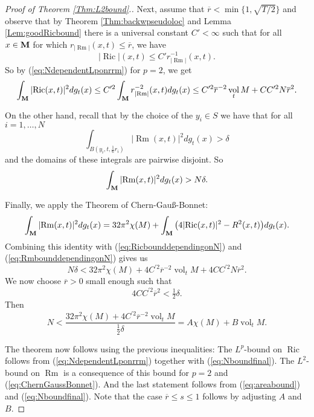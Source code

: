 \documentclass[11pt]{amsart}
\numberwithin{equation}{section}
\def\M{{\bf M}}
\DeclareMathOperator{\Ric}{Ric}
\DeclareMathOperator{\Rm}{Rm}
\DeclareMathOperator{\vol}{vol}
\newcommand{\rrm}{r_{|{\Rm}|}}
\numberwithin{equation}{section}
\begin{document}
\begin{proof}[Proof of Theorem \ref{Thm:L2bound}.]
Next, assume that $\overline{r} < \min \{ 1, \sqrt{T/2} \}$ and observe that by Theorem \ref{Thm:backwpseudoloc} and Lemma \ref{Lem:goodRicbound} there is a universal constant $C' < \infty$ such that for all $x \in \M$ for which $\rrm (x,t) \leq \overline{r}$, we have
\[ |{\Ric}|(x,t) \leq C' \rrm^{-1} (x,t). \]
So by (\ref{eq:NdependentLponrrm}) for $p = 2$, we get
\begin{equation} \label{eq:RicbounddependingonN}
 \int_{\M} |{\Ric} (x, t) |^2  dg_t(x) \leq C^{\prime 2} \int_{\M} \rrm^{-2} (x, t) dg_t(x) \leq C^{\prime 2} \overline{r}^{-2} \vol_t M + C C^{\prime 2} N \overline{r}^{2}.
\end{equation}

On the other hand, recall that by the choice of the $y_i \in S$ we have that for all $i = 1, \ldots, N$
\[ \int_{B(y_i, t, \frac16 r_i)} |{\Rm}( x,t)|^2  dg_t(x) > \delta \]
and the domains of these integrals are pairwise disjoint.
So
\begin{equation} \label{eq:RmbounddependingonN}
 \int_{\M} |{\Rm}(x, t)|^{2} dg_t(x) > N \delta.
\end{equation}

Finally, we apply the Theorem of Chern-Gau\ss-Bonnet:
\begin{equation} \label{eq:ChernGaussBonnet}
 \int_{\M} |{\Rm}(x,t)|^2  dg_t(x) = 32 \pi^2 \chi(M) + \int_{\M} \big( 4 |{\Ric} (x,t)|^2 - R^2 (x,t) \big) dg_t(x).
\end{equation}
Combining this identity with (\ref{eq:RicbounddependingonN}) and (\ref{eq:RmbounddependingonN}) gives us
\[ N \delta < 32 \pi^2 \chi(M) + 4 C^{\prime 2} \overline{r}^{-2} \vol_t M + 4 C C^{\prime 2} N \overline{r}^2. \]
We now choose $\overline{r} > 0$ small enough such that
\[ 4 C C^{\prime 2} \overline{r}^2 < \tfrac12 \delta. \]
Then
\begin{equation} \label{eq:Nboundfinal}
  N < \frac{32 \pi^2 \chi(M) + 4 C^{\prime 2} \overline{r}^{-2} \vol_t M}{\frac12 \delta} = A \chi(M) + B \vol_t M.
\end{equation}

The theorem now follows using the previous inequalities:
The $L^p$-bound on $\Ric$ follows from (\ref{eq:NdependentLponrrm}) together with (\ref{eq:Nboundfinal}).
The $L^2$-bound on $\Rm$ is a consequence of this bound for $p=2$ and (\ref{eq:ChernGaussBonnet}).
And the last statement follows from (\ref{eq:areabound}) and (\ref{eq:Nboundfinal}).
Note that the case $\overline{r} \leq s \leq 1$ follows by adjusting $A$ and $B$.
\end{proof}
\end{document}
